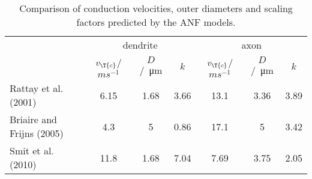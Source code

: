 \begin{table}[htb]
\centering
\caption{Comparison of conduction velocities, outer diameters and scaling factors predicted by the ANF models.}
\begin{tabular}{l|ccc|ccc}
& \multicolumn{3}{c|}{dendrite} & \multicolumn{3}{c}{axon}\\
& $v_{\T{c}}$/$ms^{-1}$ & $D$/\SI{}{\micro\meter} & $k$ & $v_{\T{c}}$/$ms^{-1}$ & $D$/\SI{}{\micro\meter} & $k$\\\hline
Rattay et al. (2001) & 6.15 & 1.68 & 3.66 & 13.1 & 3.36 & 3.89\\
Briaire and Frijns (2005) & 4.3 & 5 & 0.86 & 17.1 & 5 & 3.42\\
Smit et al. (2010) & 11.8 & 1.68 & 7.04 & 7.69 & 3.75 & 2.05\\
\end{tabular}
\label{tbl:con_vel_table}
\end{table}